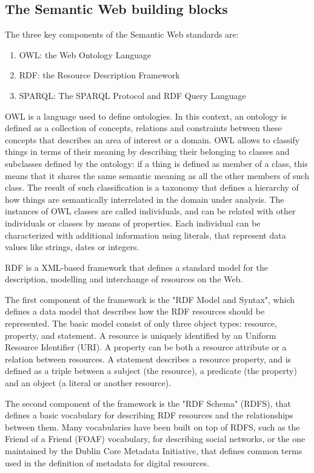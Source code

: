 \documentclass[%
    corpo=13.5pt,
    twoside,
    oldstyle,
    tipotesi=magistrale,
    greek,
    evenboxes
]{toptesi}
\begin{document}
\subsection{The Semantic Web building blocks}

The three key components of the Semantic Web standards are:
\begin{enumerate}
\item OWL: the Web Ontology Language
\item RDF: the Resource Description Framework
\item SPARQL: The SPARQL Protocol and RDF Query Language
\end{enumerate}
\bigskip

OWL is a language used to define ontologies. In this context, an ontology
is defined as a collection of concepts, relations and constraints between
these concepts that describes an area of interest or a domain.
OWL allows to classify things in terms of their meaning by describing
their belonging to classes and subclasses defined by the ontology: if
a thing is defined as member of a class, this means that it shares the
same semantic meaning as all the other members of such class. The result of
such classification is a taxonomy that defines a hierarchy of how things
are semantically interrelated in the domain under analysis.
The instances of OWL classes are called individuals, and can be related
with other individuals or classes by means of properties. Each individual
can be characterized with additional information using literals, that
represent data values like strings, dates or integers.
\newline

RDF is a XML-based framework that defines a standard model for the
description, modelling and interchange of resources on the Web.

The first component of the framework is the "RDF Model and Syntax",
which defines a data model that describes how the RDF resources should be
represented. The basic model consist of only three object types: resource,
property, and statement.
A resource is uniquely identified by an Uniform Resource Identifier (URI).
A property can be both a resource attribute or a relation between resources.
A statement describes a resource property, and is defined as a triple
between a subject (the resource), a predicate (the property) and an
object (a literal or another resource).

The second component of the framework is the "RDF Schema" (RDFS),
that defines a basic vocabulary for describing RDF resources and the
relationships between them. Many vocabularies have been built on top of
RDFS, such as the Friend of a Friend (FOAF) vocabulary, for describing
social networks, or the one maintained by the Dublin Core Metadata
Initiative, that defines common terms used in the definition of metadata
for digital resources.
\end{document}
